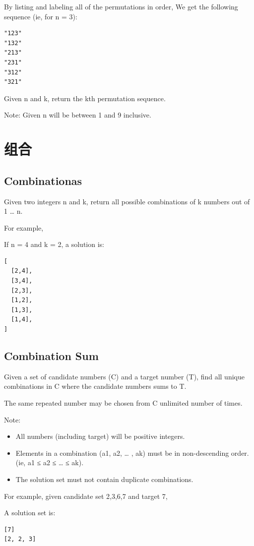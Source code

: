 \documentclass[11pt]{book}
\begin{document}
By listing and labeling all of the permutations in order, We get the following sequence (ie, for n = 3):
\lstset{language=java,label= ,caption= ,numbers=none}
\begin{lstlisting}
"123"
"132"
"213"
"231"
"312"
"321"
\end{lstlisting}
Given n and k, return the kth permutation sequence.

Note: Given n will be between 1 and 9 inclusive.
\section{组合}
\label{sec-16-2}
\subsection{Combinationas}
\label{sec-16-2-1}
Given two integers n and k, return all possible combinations of k numbers out of 1 \ldots{} n.

For example,

If n = 4 and k = 2, a solution is:
\lstset{language=java,label= ,caption= ,numbers=none}
\begin{lstlisting}
[
  [2,4],
  [3,4],
  [2,3],
  [1,2],
  [1,3],
  [1,4],
]
\end{lstlisting}
\subsection{Combination Sum}
\label{sec-16-2-2}
Given a set of candidate numbers (C) and a target number (T), find all unique combinations in C where the candidate numbers sums to T.

The same repeated number may be chosen from C unlimited number of times.

Note:
\begin{itemize}
\item All numbers (including target) will be positive integers.
\item Elements in a combination (a1, a2, … , ak) must be in non-descending order. (ie, a1 ≤ a2 ≤ … ≤ ak).
\item The solution set must not contain duplicate combinations.
\end{itemize}

For example, given candidate set 2,3,6,7 and target 7, 

A solution set is: 
\lstset{language=java,label= ,caption= ,numbers=none}
\begin{lstlisting}
[7] 
[2, 2, 3]
\end{lstlisting}
\end{document}
